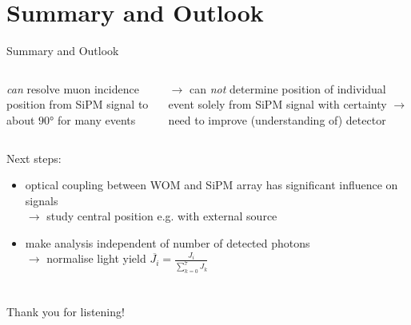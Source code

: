\documentclass[aspectratio=169]{beamer}
\begin{document}
	
	
	
	\section{Summary and Outlook}
	
	\begin{frame}{Summary and Outlook}
		\begin{columns}[t]
			\begin{column}{.5\textwidth}
				\centering
				\textit{can} resolve muon incidence position from SiPM signal to about $\ang{90}$ for many events
			\end{column}
			\begin{column}{.5\textwidth}
				$\rightarrow$ can \textit{not} determine position of individual event solely from SiPM signal with certainty \linebreak
				$\rightarrow$ need to improve (understanding of) detector
			\end{column}
		\end{columns}
	\vspace{1cm}
	\centering
	Next steps:
		\begin{itemize}
			\item optical coupling between WOM and SiPM array has significant influence on signals \\
			$\rightarrow$ study central position e.g. with external source
			\item make analysis independent of number of detected photons \\
			$\rightarrow$ normalise light yield $\overline{J_i} = \frac{J_i}{\sum_{k=0}^{7} J_k}$
		\end{itemize}
	\end{frame}
	
	\section{}
	\begin{frame}
		\vfill
		\vfill
		\vspace*{\fill}
		\begin{flushright}
					Thank you for listening!
		\end{flushright}

		
	\end{frame}
	
\end{document}
